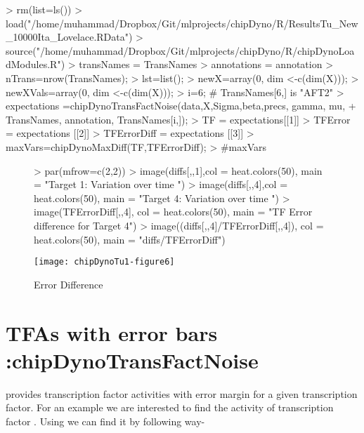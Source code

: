 \documentclass{article}
\begin{document}
\begin{Schunk}
\begin{Sinput}
> rm(list=ls())
> load("/home/muhammad/Dropbox/Git/mlprojects/chipDyno/R/ResultsTu_New_10000Ita_Lovelace.RData")
> source("/home/muhammad/Dropbox/Git/mlprojects/chipDyno/R/chipDynoLoadModules.R")
> transNames = TransNames
> annotations = annotation
> nTrans=nrow(TransNames);
> lst=list();
> newX=array(0, dim <-c(dim(X)));
> newXVals=array(0, dim <-c(dim(X)));
> i=6; # TransNames[6,] is "AFT2"
> expectations =chipDynoTransFactNoise(data,X,Sigma,beta,precs, gamma, mu, 
+   					TransNames, annotation, TransNames[i,]);
> TF = expectations[[1]]
> TFError = expectations [[2]]
> TFErrorDiff = expectations [[3]]
> maxVars=chipDynoMaxDiff(TF,TFErrorDiff);
> #maxVars
\end{Sinput}
\end{Schunk}


\begin{figure}
\begin{Schunk}
\begin{Sinput}
> par(mfrow=c(2,2))
> image(diffs[,,1],col = heat.colors(50), main = "Target 1: Variation over time ")
> image(diffs[,,4],col = heat.colors(50), main = "Target 4: Variation over time ")
> image(TFErrorDiff[,,4], col = heat.colors(50), main = "TF Error difference for Target 4")
> image((diffs[,,4]/TFErrorDiff[,,4]), col = heat.colors(50), main = "diffs/TFErrorDiff")
\end{Sinput}
\end{Schunk}
\texttt{[image: chipDynoTu1-figure6]}
\caption{Error Difference}
\label{Error_Diff}
\end{figure}


\section{TFAs with error bars :chipDynoTransFactNoise}
 provides transcription factor activities with error margin for a given transcription factor. For an example we are interested to find the activity of transcription factor . Using  we can find it by following way-
\end{document}
